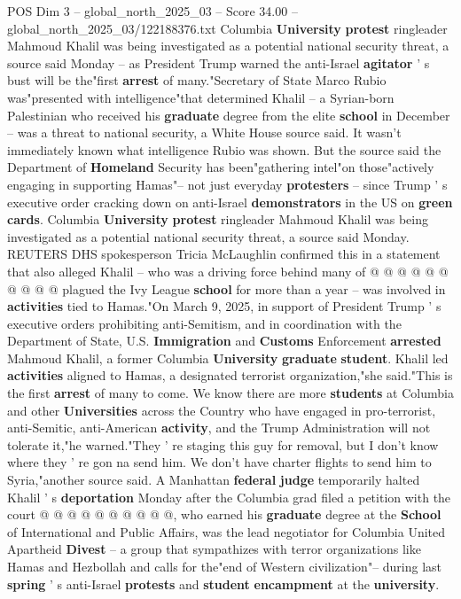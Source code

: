 \begin{textsample}{POS Dim 3 – global\_north\_2025\_03 – Score 34.00 – global\_north\_2025\_03/122188376.txt}  \label{ex:f3_pos_025}
Columbia \textbf{University} \textbf{protest} ringleader Mahmoud Khalil was being investigated as a potential national security threat, a source said Monday -- as President Trump warned the anti-Israel \textbf{agitator} ' s bust will be the"first \textbf{arrest} of many."Secretary of State Marco Rubio was"presented with intelligence"that determined Khalil -- a Syrian-born Palestinian who received his \textbf{graduate} degree from the elite \textbf{school} in December -- was a threat to national security, a White House source said.
It wasn't immediately known what intelligence Rubio was shown.
But the source said the Department of \textbf{Homeland} Security has been"gathering intel"on those"actively engaging in supporting Hamas"-- not just everyday \textbf{protesters} -- since Trump ' s executive order cracking down on anti-Israel \textbf{demonstrators} in the US on \textbf{green} \textbf{cards}.
Columbia \textbf{University} \textbf{protest} ringleader Mahmoud Khalil was being investigated as a potential national security threat, a source said Monday.
REUTERS DHS spokesperson Tricia McLaughlin confirmed this in a statement that also alleged Khalil -- who was a driving force behind many of @ @ @ @ @ @ @ @ @ @ plagued the Ivy League \textbf{school} for more than a year -- was involved in \textbf{activities} tied to Hamas."On March 9, 2025, in support of President Trump ' s executive orders prohibiting anti-Semitism, and in coordination with the Department of State, U.S. \textbf{Immigration} and \textbf{Customs} Enforcement \textbf{arrested} Mahmoud Khalil, a former Columbia \textbf{University} \textbf{graduate} \textbf{student}.
Khalil led \textbf{activities} aligned to Hamas, a designated terrorist organization,"she said."This is the first \textbf{arrest} of many to come.
We know there are more \textbf{students} at Columbia and other \textbf{Universities} across the Country who have engaged in pro-terrorist, anti-Semitic, anti-American \textbf{activity}, and the Trump Administration will not tolerate it,"he warned."They ' re staging this guy for removal, but I don't know where they ' re gon na send him.
We don't have charter flights to send him to Syria,"another source said.
A Manhattan \textbf{federal} \textbf{judge} temporarily halted Khalil ' s \textbf{deportation} Monday after the Columbia grad filed a petition with the court @ @ @ @ @ @ @ @ @ @, who earned his \textbf{graduate} degree at the \textbf{School} of International and Public Affairs, was the lead negotiator for Columbia United Apartheid \textbf{Divest} -- a group that sympathizes with terror organizations like Hamas and Hezbollah and calls for the"end of Western civilization"-- during last \textbf{spring} ' s anti-Israel \textbf{protests} and \textbf{student} \textbf{encampment} at the \textbf{university}.

\end{textsample}
